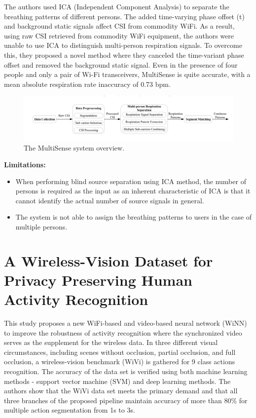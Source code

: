 The authors used ICA (Independent Component Analysis) to separate the breathing patterns of different persons. The added time-varying phase offset (t) and background static signals affect CSI from commodity WiFi. As a result, using raw CSI retrieved from commodity WiFi equipment, the authors were unable to use ICA to distinguish multi-person respiration signals. To overcome this, they proposed a novel method where they canceled the time-variant phase offset and removed the background static signal. Even in the presence of four people and only a pair of Wi-Fi transceivers, MultiSense is quite accurate, with a mean absolute respiration rate inaccuracy of 0.73 bpm.

\begin{figure}[H]
\centering
\includegraphics[width=1.0\textwidth]{./figure/chap 2/5.png}
\caption{The MultiSense system overview.}
\label{2.5}
\end{figure}

 \textbf{Limitations:}

\begin{itemize}
\item When performing blind source separation using ICA method, the number of persons is required as the input as an inherent characteristic of ICA is that it cannot identify the actual number of source signals in general. 
\item The system is not able to assign the breathing patterns to users in the case of multiple persons.
\end{itemize}

\section{A Wireless-Vision Dataset for Privacy Preserving Human Activity Recognition}
This study \cite{9264288} proposes a new WiFi-based and video-based neural network (WiNN) to improve the robustness of activity recognition where the synchronized video serves as the supplement for the wireless data. In three different visual circumstances, including scenes without occlusion, partial occlusion, and full occlusion, a wireless-vision benchmark (WiVi) is gathered for 9 class actions recognition. The accuracy of the data set is verified using both machine learning methods - support vector machine (SVM) and deep learning methods. The authors show that the WiVi data set meets the primary demand and that all three branches of the proposed pipeline maintain accuracy of more than 80\% for multiple action segmentation from 1s to 3s. 

